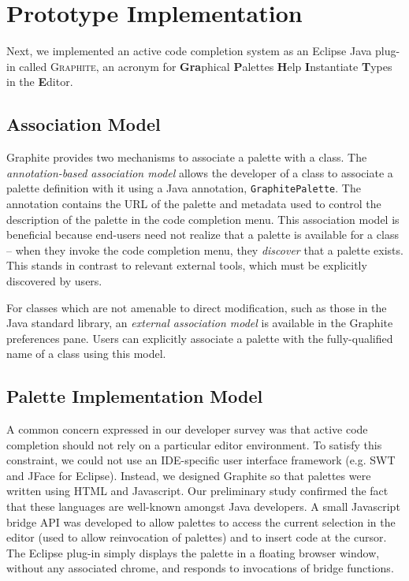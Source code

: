 \documentclass[conference]{IEEEtran}
\begin{document}
\section{Prototype Implementation}

Next, we implemented an active code completion system as an Eclipse Java plug-in called \textsc{Graphite}, an acronym for \textbf{Gra}phical \textbf{P}alettes \textbf{H}elp \textbf{I}nstantiate \textbf{T}ypes in the \textbf{E}ditor. 

\subsection{Association Model}
Graphite provides two mechanisms to associate a palette with a class. The {\it annotation-based association model} allows the developer of a class to associate a palette definition with it using a Java annotation, \texttt{GraphitePalette}. The annotation contains the URL of the palette and metadata used to control the description of the palette in the code completion menu. This association model is beneficial because end-users need not realize that a palette is available for a class -- when they invoke the code completion menu, they {\it discover} that a palette exists. This stands in contrast to relevant external tools, which must be explicitly discovered by users.

For classes which are not amenable to direct modification, such as those in the Java standard library, an {\it external association model} is available in the Graphite preferences pane. Users can explicitly associate a palette with the fully-qualified name of a class using this model.

\subsection{Palette Implementation Model}

A common concern expressed in our developer survey was that active code completion should not rely on a particular editor environment. To satisfy this constraint, we could not use an IDE-specific user interface framework (e.g. SWT and JFace for Eclipse). Instead, we designed Graphite so that palettes were written using HTML and Javascript. Our preliminary study confirmed the fact that these languages are well-known amongst Java developers. A small Javascript bridge API was developed to allow palettes to access the current selection in the editor (used to allow reinvocation of palettes) and to insert code at the cursor. The Eclipse plug-in simply displays the palette in a floating browser window, without any associated chrome, and responds to invocations of bridge functions. 
\end{document}
